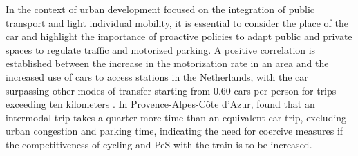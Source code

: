 \begin{refsegment}
In the context of urban development focused on the integration of public transport and light individual mobility, it is essential to consider the place of the car and highlight the importance of proactive policies to adapt public and private spaces to regulate traffic and motorized parking. A positive correlation is established between the increase in the motorization rate in an area and the increased use of cars to access stations in the Netherlands, with the car surpassing other modes of transfer starting from 0.60 cars per person for trips exceeding ten kilometers \textcolor{blue}{\autocite[281]{debrezion_modelling_2009}}. In Provence-Alpes-Côte d'Azur, \textcolor{blue}{\autocite[190]{moinse_intermodal_2022}} found that an intermodal trip takes a quarter more time than an equivalent car trip, excluding urban congestion and parking time, indicating the need for coercive measures if the competitiveness of cycling and \acrshort{PeS} with the train is to be increased.%


\end{refsegment}
